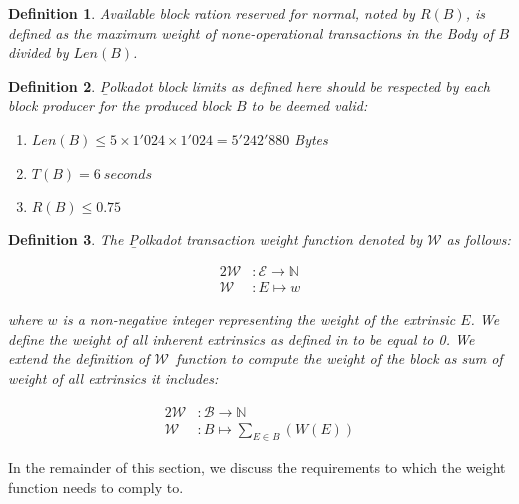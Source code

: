 \documentclass[11pt,a4paper]{article}
\newtheorem{definition}{Definition}
\newcommand{\TWF}{\ensuremath{\mathcal{W}}}
\begin{document}
\begin{definition}
  \label{def:block-target-time}
  Available block ration reserved for normal, noted by $R(B)$, is defined as the
  maximum weight of none-operational transactions in the Body of $B$ divided by
  $Len(B)$.
\end{definition}

\begin{definition}
  \label{def:polkadot-block-limits}
        {\b Polkadot block limits} as defined here should be respected by each
        block producer for the produced block $B$ to be deemed valid:
        
        \begin{enumerate}
         \item $Len(B) \le 5 \times 1'024 \times 1'024 = 5'242'880$ Bytes
         \item $T(B) = 6\ seconds$
         \item $R(B) \le 0.75$
        \end{enumerate}
        
\end{definition}

\begin{definition}
  \label{defn:weight-function}
  The {\b Polkadot transaction weight function} denoted by $\mathcal{W}$ as follows:

  \begin{alignat*}{2}
    \mathcal{W} &: \mathcal{E} \rightarrow \mathbb{N} \\
    \mathcal{W} &: E \mapsto w
  \end{alignat*}

  where $w$ is a non-negative integer representing the weight of the extrinsic
  $E$. We define the weight of all inherent extrinsics as defined in
  \cite[Definition~3.3]{web30_technologies_foundation_polkadot_2020} to be equal
  to 0. We extend the definition of \TWF\ function to compute the weight of the
  block as sum of weight of all extrinsics it includes:

  \begin{alignat*}{2}
    \mathcal{W} &: \mathcal{B}\rightarrow \mathbb{N} \\
    \mathcal{W} &: B \mapsto \sum_{E\in B}(W(E))
  \end{alignat*}
  
\end{definition}

In the remainder of this section, we discuss the requirements to which the
weight function needs to comply to.
\end{document}
